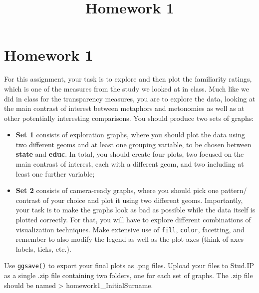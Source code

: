 \documentclass[
  12pt,
]{article}
\title{Homework 1}
\author{}
\date{\vspace{-2.5em}}
\begin{document}
\maketitle

\hypertarget{homework-1}{%
\section{Homework 1}\label{homework-1}}

For this assignment, your task is to explore and then plot the
familiarity ratings, which is one of the measures from the study we
looked at in class. Much like we did in class for the transparency
measures, you are to explore the data, looking at the main contrast of
interest between metaphors and metonomies as well as at other
potentially interesting comparisons. You should produce two sets of
graphs:

\begin{itemize}
\item
  \textbf{Set 1} consists of exploration graphs, where you should plot
  the data using two different geoms and at least one grouping variable,
  to be chosen between \textbf{state} and \textbf{educ}. In total, you
  should create four plots, two focused on the main contrast of
  interest, each with a different geom, and two including at least one
  further variable;
\item
  \textbf{Set 2} consists of camera-ready graphs, where you should pick
  one pattern/ contrast of your choice and plot it using two different
  geoms. Importantly, your task is to make the graphs look as bad as
  possible while the data itself is plotted correctly. For that, you
  will have to explore different combinations of visualization
  techniques. Make extensive use of \texttt{fill}, \texttt{color},
  facetting, and remember to also modify the legend as well as the plot
  axes (think of axes labels, ticks, etc.).
\end{itemize}

Use \texttt{ggsave()} to export your final plots as .png files. Upload
your files to Stud.IP as a single .zip file containing two folders, one
for each set of graphs. The .zip file should be named \textgreater{}
homework1\_InitialSurname.
\end{document}
